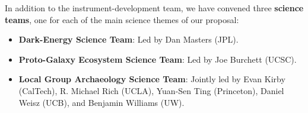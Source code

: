 \documentclass[oneside,11pt]{amsart}
\begin{document}
\noindent In addition to the instrument-development team, we have
convened three {\bf science teams}, one for each of the main science
themes of our proposal:
%
\begin{itemize}
%
\item {\bf Dark-Energy Science Team}: Led by Dan Masters (JPL).\\[-5pt]
%
\item {\bf Proto-Galaxy Ecosystem Science Team}: Led by Joe Burchett
(UCSC).\\[-5pt]
%
\item {\bf Local Group Archaeology Science Team}: Jointly led by Evan
Kirby (CalTech), R. Michael Rich (UCLA), Yuan-Sen Ting (Princeton),
Daniel Weisz (UCB), and Benjamin Williams (UW).
%
\end{itemize}



\end{document}
